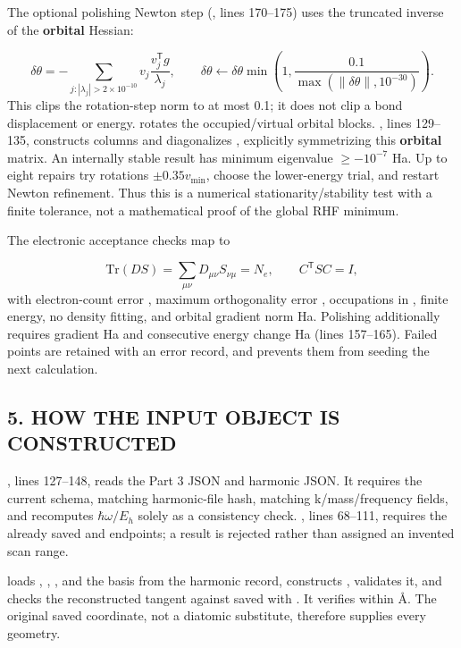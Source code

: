 \documentclass[10pt,a4paper]{article}
\begin{document}
The optional polishing Newton step (, lines 170–175) uses the truncated inverse of the \textbf{orbital} Hessian:

\[
\delta\theta=-\sum_{j:|\lambda_j|>2\times10^{-10}}v_j\frac{v_j^{\mathsf T}g}{\lambda_j},\qquad
\delta\theta\leftarrow\delta\theta\min\left(1,\frac{0.1}{\max(\|\delta\theta\|,10^{-30})}\right).
\]
This clips the rotation-step norm to at most 0.1; it does not clip a bond displacement or energy.  rotates the occupied/virtual orbital blocks. , lines 129–135, constructs columns  and diagonalizes , explicitly symmetrizing this \textbf{orbital} matrix. An internally stable result has minimum eigenvalue \(\ge-10^{-7}\) Ha. Up to eight repairs try rotations \(\pm0.35v_{\min}\), choose the lower-energy trial, and restart Newton refinement. Thus this is a numerical stationarity/stability test with a finite tolerance, not a mathematical proof of the global RHF minimum.

The electronic acceptance checks map to

\[
\mathrm{Tr}(DS)=\sum_{\mu\nu}D_{\mu\nu}S_{\nu\mu}=N_e,
\qquad C^{\mathsf T}SC=I,
\]
with electron-count error , maximum orthogonality error , occupations in , finite energy, no density fitting, and orbital gradient norm  Ha. Polishing additionally requires gradient  Ha and consecutive energy change  Ha (lines 157–165). Failed points are retained with an error record, and  prevents them from seeding the next calculation.

\subsection{5. HOW THE INPUT OBJECT IS CONSTRUCTED}
, lines 127–148, reads the Part 3 JSON and harmonic JSON. It requires the current schema, matching harmonic-file hash, matching k/mass/frequency fields, and recomputes \(\hbar\omega/E_h\) solely as a consistency check. , lines 68–111, requires the already saved  and endpoints; a  result is rejected rather than assigned an invented scan range.

 loads , , , and the basis from the harmonic record, constructs , validates it, and checks the reconstructed  tangent against saved  with . It verifies  within  Å. The original saved coordinate, not a diatomic substitute, therefore supplies every geometry.
\end{document}
